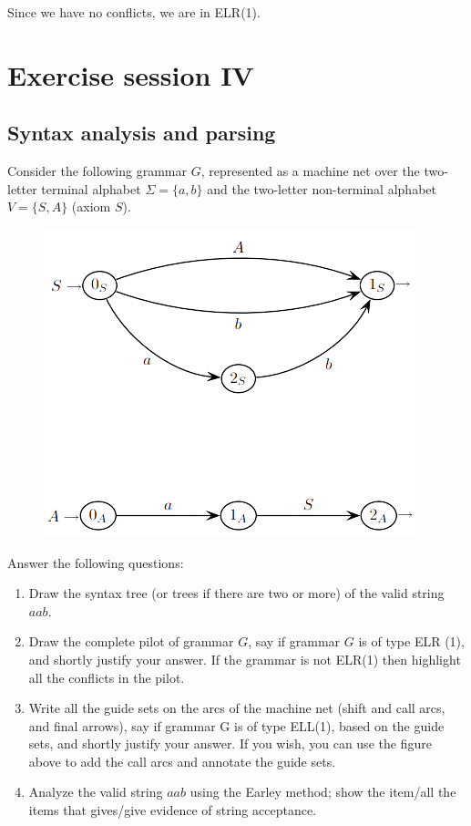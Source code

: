 \documentclass[12pt, a4paper]{report}
\newtheorem[style=M, bodystyle=\normalfont]{theorem}{Theorem}
\newtheorem[style=M, bodystyle=\normalfont]{corollary}{Corollary}
\newtheorem[style=M, bodystyle=\normalfont]{lemma}{Lemma}
\newtheorem[style=M, bodystyle=\normalfont]{definition}{Definition}
\begin{document}
    Since we have no conflicts, we are in ELR(1). 
\newpage 

\chapter{Exercise session IV}
    \section{Syntax analysis and parsing}
        Consider the following grammar $G$, represented as a machine net over the two-letter terminal alphabet $\Sigma = \{ a, b \}$ and the two-letter non-terminal alphabet 
        $V = \{ S, A \}$ (axiom $S$).
        \begin{figure}[H]
            \centering
            \includegraphics[width=0.5\linewidth]{images/parsing.png}
        \end{figure} 
        Answer the following questions:
        \begin{enumerate}
            \item Draw the syntax tree (or trees if there are two or more) of the valid string $a a b$.
            \item Draw the complete pilot of grammar $G$, say if grammar $G$ is of type ELR (1), and shortly justify your answer. If the grammar is not ELR(1) then highlight
                all the conflicts in the pilot.
            \item Write all the guide sets on the arcs of the machine net (shift and call arcs, and final arrows), say if grammar G is of type ELL(1), based on the guide sets, 
                and shortly justify your answer. If you wish, you can use the figure above to add the call arcs and annotate the guide sets.
            \item Analyze the valid string $a a b$ using the Earley method; show the item/all the items that gives/give evidence of string acceptance.
        \end{enumerate}
\end{document}
